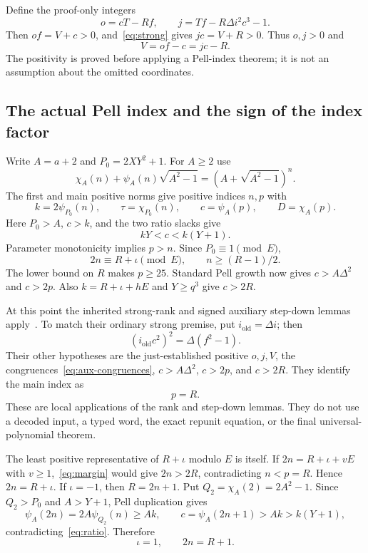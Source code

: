 \documentclass[11pt]{article}
\theoremstyle{definition}
\begin{document}
Define the proof-only integers
\begin{equation}\label{eq:restore-jo}
 o=cT-Rf,
 \qquad j=Tf-R\Delta i^2c^3-1.
\end{equation}
Then $of=V+c>0$, and~\eqref{eq:strong} gives $jc=V+R>0$.
Thus $o,j>0$ and
\begin{equation}\label{eq:aux-congruences}
 V=of-c=jc-R.
\end{equation}
The positivity is proved before applying a Pell-index theorem; it is not
an assumption about the omitted coordinates.

\subsection{The actual Pell index and the sign of the index factor}

Write $A=a+2$ and $P_0=2XY^2+1$. For $A\geq2$ use
\[
 \chi_A(n)+\psi_A(n)\sqrt{A^2-1}
 =(A+\sqrt{A^2-1})^n.
\]
The first and main positive norms give positive indices $n,p$ with
\[
 k=2\psi_{P_0}(n),\qquad
 \tau=\chi_{P_0}(n),\qquad
 c=\psi_A(p),\qquad D=\chi_A(p).
\]
Here $P_0>A$, $c>k$, and the two ratio slacks give
\begin{equation}\label{eq:ratio}
 kY<c<k(Y+1).
\end{equation}
Parameter monotonicity implies $p>n$. Since $P_0\equiv1\pmod E$,
\[
 2n\equiv R+\iota\pmod E,
 \qquad n\geq(R-1)/2.
\]
The lower bound on $R$ makes $p\geq25$. Standard Pell growth now gives
$c>A\Delta^2$ and $c>2p$. Also
$k=R+\iota+hE$ and $Y\geq q^3$ give $c>2R$.

At this point the inherited strong-rank and signed auxiliary step-down
lemmas apply~\cite{Kernel,Bezout}. To match their ordinary strong premise,
put $i_{\mathrm{old}}=\Delta i$; then
\[
 (i_{\mathrm{old}}c^2)^2=\Delta(f^2-1).
\]
Their other hypotheses are the just-established positive $o,j,V$, the
congruences~\eqref{eq:aux-congruences}, $c>A\Delta^2$, $c>2p$, and $c>2R$.
They identify the main index as
\begin{equation}\label{eq:p-R}
 p=R.
\end{equation}
These are local applications of the rank and step-down lemmas. They do not
use a decoded input, a typed word, the exact repunit equation, or the final
universal-polynomial theorem.

The least positive representative of $R+\iota$ modulo $E$ is itself.
If $2n=R+\iota+vE$ with $v\geq1$,~\eqref{eq:margin} would give
$2n>2R$, contradicting $n<p=R$. Hence $2n=R+\iota$.
If $\iota=-1$, then $R=2n+1$. Put $Q_2=\chi_A(2)=2A^2-1$.
Since $Q_2>P_0$ and $A>Y+1$, Pell duplication gives
\[
 \psi_A(2n)=2A\psi_{Q_2}(n)\geq A k,
 \qquad
 c=\psi_A(2n+1)>A k>k(Y+1),
\]
contradicting~\eqref{eq:ratio}. Therefore
\begin{equation}\label{eq:index-positive}
 \iota=1,\qquad 2n=R+1.
\end{equation}
\end{document}
